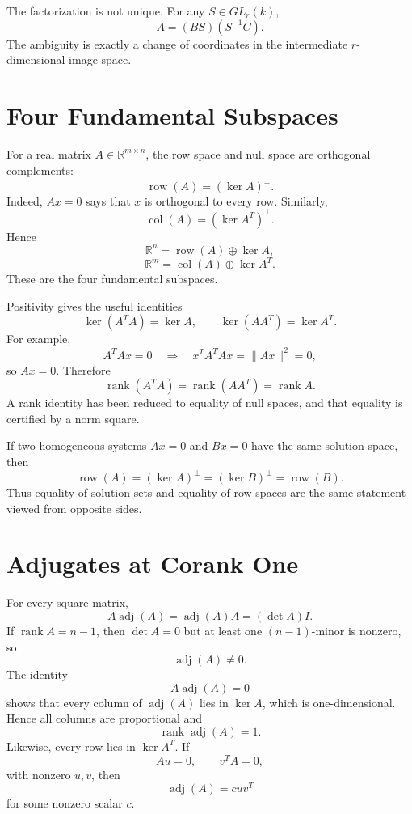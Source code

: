 The factorization is not unique.  For any \(S\in GL_r(k)\),
\[
  A=(BS)(S^{-1}C).
\]
The ambiguity is exactly a change of coordinates in the intermediate \(r\)-dimensional image space.

\section{Four Fundamental Subspaces}

For a real matrix \(A\in\mathbb R^{m\times n}\), the row space and null space are orthogonal complements:
\[
  \operatorname{row}(A)=(\ker A)^\perp.
\]
Indeed, \(Ax=0\) says that \(x\) is orthogonal to every row.  Similarly,
\[
  \operatorname{col}(A)=(\ker A^T)^\perp.
\]
Hence
\[
  \mathbb R^n
  =\operatorname{row}(A)\oplus\ker A,
\]
\[
  \mathbb R^m
  =\operatorname{col}(A)\oplus\ker A^T.
\]
These are the four fundamental subspaces.

Positivity gives the useful identities
\[
  \ker(A^TA)=\ker A,
  \qquad
  \ker(AA^T)=\ker A^T.
\]
For example,
\[
  A^TAx=0
  \quad\Longrightarrow\quad
  x^TA^TAx=\|Ax\|^2=0,
\]
so \(Ax=0\).  Therefore
\[
  \operatorname{rank}(A^TA)
  =\operatorname{rank}(AA^T)
  =\operatorname{rank}A.
\]
A rank identity has been reduced to equality of null spaces, and that equality is certified by a norm square.

If two homogeneous systems \(Ax=0\) and \(Bx=0\) have the same solution space, then
\[
  \operatorname{row}(A)
  =(\ker A)^\perp
  =(\ker B)^\perp
  =\operatorname{row}(B).
\]
Thus equality of solution sets and equality of row spaces are the same statement viewed from opposite sides.

\section{Adjugates at Corank One}

For every square matrix,
\[
  A\operatorname{adj}(A)
  =\operatorname{adj}(A)A
  =(\det A)I.
\]
If \(\operatorname{rank}A=n-1\), then \(\det A=0\) but at least one \((n-1)\)-minor is nonzero, so
\[
  \operatorname{adj}(A)\ne0.
\]
The identity
\[
  A\operatorname{adj}(A)=0
\]
shows that every column of \(\operatorname{adj}(A)\) lies in \(\ker A\), which is one-dimensional.  Hence all columns are proportional and
\[
  \operatorname{rank}\operatorname{adj}(A)=1.
\]
Likewise, every row lies in \(\ker A^T\).  If
\[
  Au=0,
  \qquad
  v^TA=0,
\]
with nonzero \(u,v\), then
\[
  \operatorname{adj}(A)=cuv^T
\]
for some nonzero scalar \(c\).


